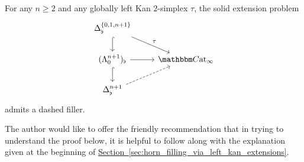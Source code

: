 \documentclass[main.tex]{subfiles}
\begin{document}
\begin{theorem}
  For any $n \geq 2$ and any globally left Kan $2$-simplex $\tau$, the solid extension problem
  \begin{equation*}
    \begin{tikzcd}
      \Delta^{\{0, 1, n+1\}}_{\flat}
      \arrow[d, hook]
      \arrow[dr, "\tau"]
      \\
      (\Lambda^{n+1}_{0})_{\flat}
      \arrow[r]
      \arrow[d, hook]
      & \ICCat
      \\
      \Delta^{n+1}_{\flat}
      \arrow[ur, dashed]
    \end{tikzcd}
  \end{equation*}
  admits a dashed filler.
\end{theorem}

The author would like to offer the friendly recommendation that in trying to understand the proof below, it is helpful to follow along with the explanation given at the beginning of \hyperref[sec:horn_filling_via_left_kan_extensions]{Section~\ref*{sec:horn_filling_via_left_kan_extensions}}.
\end{document}
